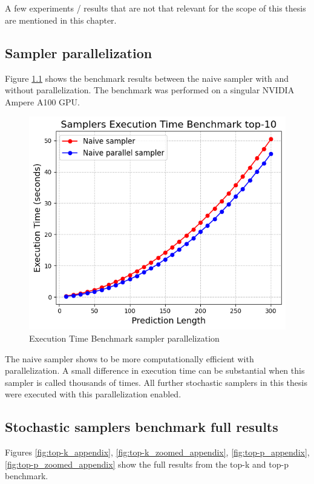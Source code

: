 \chapter[Appendix]{}
\label{chap:appendix}

A few experiments / results that are not that relevant for the scope of this thesis are mentioned in this chapter.

\section{Sampler parallelization}
\label{sec:sampler_parallelization}
Figure \ref{fig:sampler_parallelization} shows the benchmark results between the naive sampler with and without parallelization.
The benchmark was performed on a singular NVIDIA Ampere A100 GPU.
\begin{figure}[h]
    \centering
    \includegraphics[width=0.6\linewidth]{figures/appendix/sampler_parallel.png}
    \caption{Execution Time Benchmark sampler parallelization}
    \label{fig:sampler_parallelization}
\end{figure}

The naive sampler shows to be more computationally efficient with parallelization.
A small difference in execution time can be substantial when this sampler is called thousands of times.
All further stochastic samplers in this thesis were executed with this parallelization enabled.

\section{Stochastic samplers benchmark full results}
\label{sec:sampler_full_results}

Figures \ref{fig:top-k_appendix}, \ref{fig:top-k_zoomed_appendix}, \ref{fig:top-p_appendix}, \ref{fig:top-p_zoomed_appendix} show the full results from the top-k and top-p benchmark.

